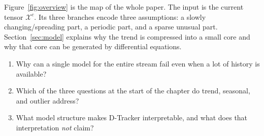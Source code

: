 Figure~\ref{fig:overview} is the map of the whole paper. The input is the current tensor
$\mathcal{X}^{c}$. Its three branches encode three assumptions: a slowly changing/spreading part, a
periodic part, and a sparse unusual part. Section~\ref{sec:model} explains why the trend is
compressed into a small core and why that core can be generated by differential equations.

\begin{selfcheck}
\begin{enumerate}
  \item Why can a single model for the entire stream fail even when a lot of history is available?
  \item Which of the three questions at the start of the chapter do trend, seasonal, and outlier address?
  \item What model structure makes D-Tracker interpretable, and what does that interpretation \emph{not} claim?
\end{enumerate}
\end{selfcheck}
